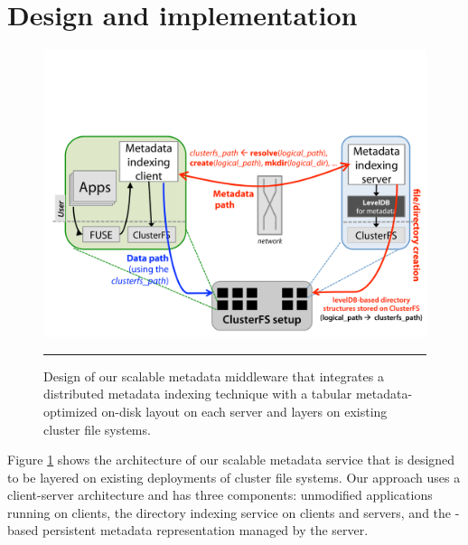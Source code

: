 \section{Design and implementation}

\begin{figure}[t]   %
\centerline{\includegraphics[scale=0.3]{./figs/giga-impl-leveldb-clusterfs}}
\caption{
{\small
Design of our scalable metadata middleware that integrates a distributed metadata indexing
technique with a tabular metadata-optimized on-disk layout on each server and
layers on existing cluster file systems. 
}
}
\vspace{10pt}
\hrule 
\label{fig:design}
\end{figure}       %

Figure \ref{fig:design} shows the architecture of our scalable metadata
service that is designed to be layered on existing deployments of cluster file
systems. Our approach uses a client-server architecture and has three components: 
unmodified applications running on clients, the \giga{} directory indexing service 
on clients and servers, and the \ldb{}-based persistent metadata representation 
managed by the server. 

